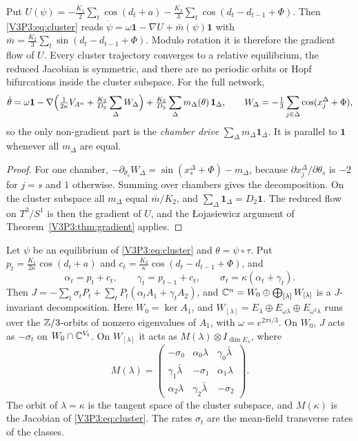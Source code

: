 \begin{theorem}\label{V3P3:thm:clustergrad}
Put $U(\psi)=-\frac{K_1}2\sum_t\cos(d_t+a)-\frac{K_2}3\sum_t\cos(d_t-d_{t-1}+\Phi)$. Then
\eqref{V3P3:eq:cluster} reads
$\dot\psi=\omega\mathbf 1-\nabla U+\bar m(\psi)\mathbf 1$ with
$\bar m=\frac{K_2}3\sum_t\sin(d_t-d_{t-1}+\Phi)$. Modulo rotation it is therefore the
gradient flow of $U$. Every cluster trajectory converges to a relative equilibrium, the reduced
Jacobian is symmetric, and there are no periodic orbits or Hopf bifurcations inside the
cluster subspace. For the full network,
\[
\dot\theta=\omega\mathbf 1-\nabla\Bigl(\tfrac{1}{2\kappa}V_{A^{\alpha}}+\tfrac{K_2}{D_2}
\sum_\Delta W_\Delta\Bigr)+\tfrac{K_2}{D_2}\sum_{\Delta}m_\Delta(\theta)\,\mathbf 1_\Delta ,
\qquad W_\Delta=-\tfrac13\sum_{j\in\Delta}\cos(x^{\Delta}_j+\Phi),
\]
so the only non-gradient part is the \emph{chamber drive} $\sum_\Delta m_\Delta\mathbf
1_\Delta$. It is parallel to $\mathbf 1$ whenever all $m_\Delta$ are equal.
\end{theorem}

\begin{proof}
For one chamber,
$-\partial_{\theta_s}W_\Delta=\sin(x^{\Delta}_s+\Phi)-m_\Delta$, because
$\partial x^{\Delta}_j/\partial\theta_s$ is $-2$ for $j=s$ and $1$ otherwise. Summing over chambers
gives the decomposition. On the cluster subspace all $m_\Delta$ equal $\bar m/K_2$, and
$\sum_\Delta\mathbf 1_\Delta=D_2\mathbf 1$. The reduced flow on $T^{3}/S^{1}$ is then the
gradient of $U$, and the \L{}ojasiewicz argument of Theorem~\ref{V3P3:thm:gradient} applies.
\end{proof}

\begin{theorem}\label{V3P3:thm:blocks}
Let $\psi$ be an equilibrium of \eqref{V3P3:eq:cluster} and $\theta=\psi\circ\tau$. Put
$p_t=\frac{K_1}{2\kappa}\cos(d_t+a)$ and $c_t=\frac{K_2}{\kappa}\cos(d_t-d_{t-1}+\Phi)$, and
\[
\alpha_t=p_t+c_t,\qquad \gamma_t=p_{t-1}+c_t,\qquad \sigma_t=\kappa(\alpha_t+\gamma_t).
\]
Then $J=-\sum_t\sigma_tP_t+\sum_tP_t(\alpha_tA_1+\gamma_tA_2)$, and
$\mathbb{C}^{n}=W_0\oplus\bigoplus_{[\lambda]}W_{[\lambda]}$ is a $J$-invariant decomposition. Here
$W_0=\ker A_1$, and $W_{[\lambda]}=E_\lambda\oplus E_{\omega\lambda}\oplus
E_{\omega^{2}\lambda}$ runs over the $\mathbb{Z}/3$-orbits of nonzero eigenvalues of $A_1$, with
$\omega=e^{2\pi i/3}$. On $W_0$, $J$ acts as $-\sigma_t$ on $W_0\cap\mathbb{C}^{V_t}$. On
$W_{[\lambda]}$ it acts as $M(\lambda)\otimes I_{\dim E_\lambda}$, where
\[
M(\lambda)=\begin{pmatrix}-\sigma_0&\alpha_0\lambda&\gamma_0\bar\lambda\\
\gamma_1\bar\lambda&-\sigma_1&\alpha_1\lambda\\ \alpha_2\lambda&\gamma_2\bar\lambda&-\sigma_2
\end{pmatrix}.
\]
The orbit of $\lambda=\kappa$ is the tangent space of the cluster subspace, and $M(\kappa)$ is
the Jacobian of \eqref{V3P3:eq:cluster}. The rates $\sigma_t$ are the mean-field transverse
rates of the classes.
\end{theorem}

